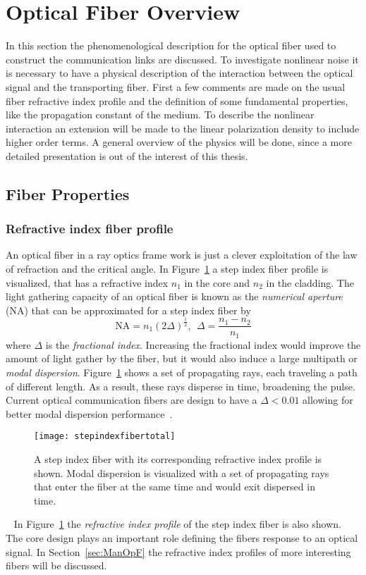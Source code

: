 \section{Optical Fiber Overview}
In this section the phenomenological description for the optical fiber used to construct the communication links are discussed. To investigate nonlinear noise it is necessary to have a physical description of the interaction between the optical signal and the transporting fiber. First a few comments are made on the usual fiber refractive index profile and the definition of some fundamental properties, like the propagation constant of the medium. To describe the nonlinear interaction an extension will be made to the linear polarization density to include higher order terms. A general overview of the physics will be done, since a more detailed presentation is out of the interest of this thesis. 


\subsection{Fiber Properties}\label{sec:Fiber} 
\subsubsection{Refractive index fiber profile}

An optical fiber in a ray optics frame work is just a clever exploitation of the law of refraction and the critical angle.  In Figure~\ref{fig:FiberProf} a step index fiber profile is visualized, that has a refractive index $n_1$ in the core and $n_2$ in the cladding. The light gathering capacity of an optical fiber is known as the \emph{numerical aperture} (NA) that can be approximated for a step index fiber by 
\begin{equation}
\text{NA}=n_1(2\Delta)^\frac{1}{2}, \ \ \Delta=\frac{n_1-n_2}{n_1}
\end{equation}
where $\Delta$ is the \emph{fractional index}. Increasing the fractional index would improve the amount of light gather by the fiber, but it would also induce a large multipath or \emph{modal dispersion}. Figure~\ref{fig:FiberProf} shows a set of propagating rays, each traveling a path of different length. As a result, these rays disperse in time, broadening the pulse. Current optical communication fibers are design to have a $\Delta < 0.01$  allowing for better modal dispersion performance~\cite{FiberAgrawal}.  
\begin{figure}[H]
\center
\texttt{[image: stepindexfibertotal]}
\caption{A step index fiber with its corresponding refractive index profile is shown. Modal dispersion is visualized with a set of propagating rays that enter the fiber at the same time and would exit dispersed in time.  }
\label{fig:FiberProf}
\end{figure}
~
In Figure~\ref{fig:FiberProf} the \textit{refractive index profile} of the step index fiber is also shown. The core design plays an important role defining the fibers response to an optical signal. In Section~\ref{sec:ManOpF} the refractive index profiles of more interesting fibers will be discussed. 



